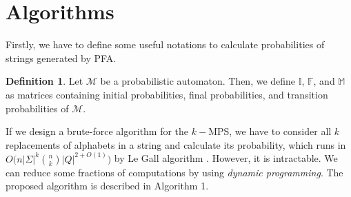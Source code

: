 \documentclass{article}
\theoremstyle{plain}
\theoremstyle{definition}
\newtheorem{definition}{Definition}
\theoremstyle{remark}
\begin{document}
\section{Algorithms}
Firstly, we have to define some useful notations to calculate probabilities of strings generated by PFA.
\begin{definition}
Let $\mathcal{M}$ be a probabilistic automaton. Then, we define $\mathbb{I}$, $\mathbb{F}$, and $\mathbb{M}$ as matrices containing initial probabilities, final probabilities, and transition probabilities of $\mathcal{M}$.
\end{definition}
If we design a brute-force algorithm for the $k-$MPS, we have to consider all $k $ replacements of alphabets in a string and calculate its probability, which runs in $O\big(n{|\Sigma|}^{k}{n\choose k}{|Q|}^{2+O(1)} \big)$ by Le Gall algorithm \cite{le2014powers}. However, it is intractable. We can reduce some fractions of computations by using \textit{dynamic programming}. The proposed algorithm is described in Algorithm 1.
\end{document}
